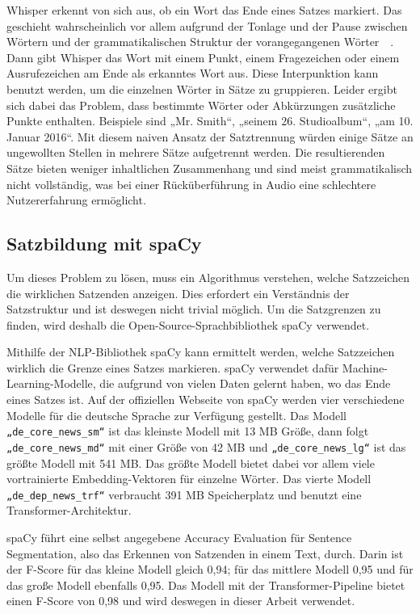 Whisper erkennt von sich aus, ob ein Wort das Ende eines Satzes markiert.
Das geschieht wahrscheinlich vor allem aufgrund der Tonlage und der Pause zwischen Wörtern und der grammatikalischen Struktur der vorangegangenen Wörter~\cite{biron2021}~\cite{radford}.
Dann gibt Whisper das Wort mit einem Punkt, einem Fragezeichen oder einem Ausrufezeichen am Ende als erkanntes Wort aus.
Diese Interpunktion kann benutzt werden, um die einzelnen Wörter in Sätze zu gruppieren.
Leider ergibt sich dabei das Problem, dass bestimmte Wörter oder Abkürzungen zusätzliche Punkte enthalten.
Beispiele sind „Mr. Smith“, „seinem 26. Studioalbum“, „am 10. Januar 2016“.
Mit diesem naiven Ansatz der Satztrennung würden einige Sätze an ungewollten Stellen in mehrere Sätze aufgetrennt werden.
Die resultierenden Sätze bieten weniger inhaltlichen Zusammenhang und sind meist grammatikalisch nicht vollständig, was bei einer Rücküberführung in Audio eine schlechtere Nutzererfahrung ermöglicht.

\subsection{Satzbildung mit spaCy}

Um dieses Problem zu lösen, muss ein Algorithmus verstehen, welche Satzzeichen die wirklichen Satzenden anzeigen.
Dies erfordert ein Verständnis der Satzstruktur und ist deswegen nicht trivial möglich.
Um die Satzgrenzen zu finden, wird deshalb die Open-Source-Sprachbibliothek spaCy verwendet.~\cite{honnibal2017}

Mithilfe der NLP-Bibliothek spaCy kann ermittelt werden, welche Satzzeichen wirklich die Grenze eines Satzes markieren.
spaCy verwendet dafür Machine-Learning-Modelle, die aufgrund von vielen Daten gelernt haben, wo das Ende eines Satzes ist.
Auf der offiziellen Webseite von spaCy werden vier verschiedene Modelle für die deutsche Sprache zur Verfügung gestellt.
Das Modell \verb|„de_core_news_sm“| ist das kleinste Modell mit 13 MB Größe, dann folgt \verb|„de_core_news_md“| mit einer Größe von 42 MB und \verb|„de_core_news_lg“| ist das größte Modell mit 541 MB.
Das größte Modell bietet dabei vor allem viele vortrainierte Embedding-Vektoren für einzelne Wörter.
Das vierte Modell \verb|„de_dep_news_trf“| verbraucht 391 MB Speicherplatz und benutzt eine Transformer-Architektur.

spaCy führt eine selbst angegebene Accuracy Evaluation für Sentence Segmentation, also das Erkennen von Satzenden in einem Text, durch.
Darin ist der F-Score für das kleine Modell gleich 0,94; für das mittlere Modell 0,95 und für das große Modell ebenfalls 0,95.
Das Modell mit der Transformer-Pipeline bietet einen F-Score von 0,98 und wird deswegen in dieser Arbeit verwendet.~\cite{spacy2024}

